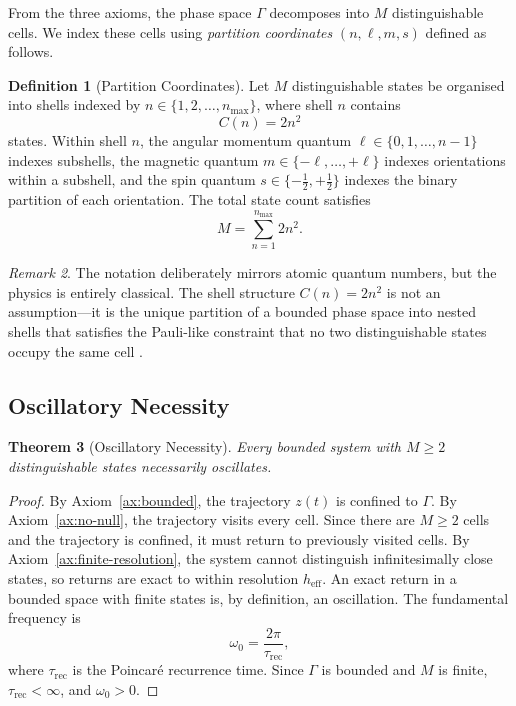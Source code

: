 \documentclass[11pt,twocolumn,a4paper]{article}
\newtheorem{theorem}{Theorem}[section]
\theoremstyle{definition}
\newtheorem{definition}[theorem]{Definition}
\theoremstyle{remark}
\newtheorem{remark}[theorem]{Remark}
\begin{document}
From the three axioms, the phase space $\Gamma$ decomposes into $M$ distinguishable cells.  We index these cells using \emph{partition coordinates} $(n, \ell, m, s)$ defined as follows.

\begin{definition}[Partition Coordinates]\label{def:partition-coords}
Let $M$ distinguishable states be organised into shells indexed by $n \in \{1, 2, \ldots, n_{\max}\}$, where shell $n$ contains
\begin{equation}\label{eq:shell-capacity}
    C(n) = 2n^2
\end{equation}
states.  Within shell $n$, the angular momentum quantum $\ell \in \{0, 1, \ldots, n-1\}$ indexes subshells, the magnetic quantum $m \in \{-\ell, \ldots, +\ell\}$ indexes orientations within a subshell, and the spin quantum $s \in \{-\tfrac{1}{2}, +\tfrac{1}{2}\}$ indexes the binary partition of each orientation.  The total state count satisfies
\begin{equation}\label{eq:total-states}
    M = \sum_{n=1}^{n_{\max}} 2n^2.
\end{equation}
\end{definition}

\begin{remark}
The notation deliberately mirrors atomic quantum numbers, but the physics is entirely classical.  The shell structure $C(n) = 2n^2$ is not an assumption---it is the unique partition of a bounded phase space into nested shells that satisfies the Pauli-like constraint that no two distinguishable states occupy the same cell \citep{sachikonye2026trajectory}.
\end{remark}

\subsection{Oscillatory Necessity}

\begin{theorem}[Oscillatory Necessity]\label{thm:oscillatory-necessity}
Every bounded system with $M \geq 2$ distinguishable states necessarily oscillates.
\end{theorem}

\begin{proof}
By Axiom~\ref{ax:bounded}, the trajectory $z(t)$ is confined to $\Gamma$.  By Axiom~\ref{ax:no-null}, the trajectory visits every cell.  Since there are $M \geq 2$ cells and the trajectory is confined, it must return to previously visited cells.  By Axiom~\ref{ax:finite-resolution}, the system cannot distinguish infinitesimally close states, so returns are exact to within resolution $h_{\mathrm{eff}}$.  An exact return in a bounded space with finite states is, by definition, an oscillation.  The fundamental frequency is
\begin{equation}\label{eq:fundamental-frequency}
    \omega_0 = \frac{2\pi}{\tau_{\mathrm{rec}}},
\end{equation}
where $\tau_{\mathrm{rec}}$ is the Poincar\'{e} recurrence time.  Since $\Gamma$ is bounded and $M$ is finite, $\tau_{\mathrm{rec}} < \infty$, and $\omega_0 > 0$.
\end{proof}
\end{document}
